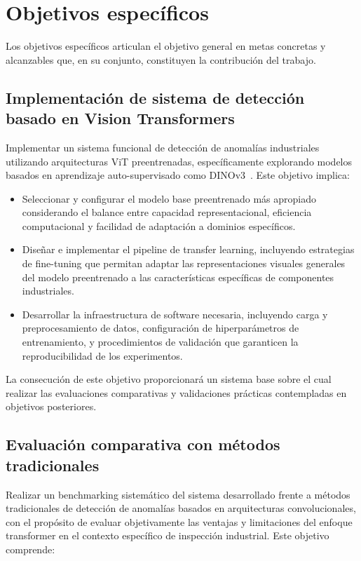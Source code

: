 \section{Objetivos específicos}

Los objetivos específicos articulan el objetivo general en metas concretas y alcanzables que, en su conjunto, constituyen la contribución del trabajo.

\subsection{Implementación de sistema de detección basado en Vision Transformers}

Implementar un sistema funcional de detección de anomalías industriales utilizando arquitecturas \acrlong{ViT} preentrenadas, específicamente explorando modelos basados en aprendizaje auto-supervisado como DINOv3~\cite{simeoni2025dinov3}. Este objetivo implica:

\begin{itemize}
    \item Seleccionar y configurar el modelo base preentrenado más apropiado considerando el balance entre capacidad representacional, eficiencia computacional y facilidad de adaptación a dominios específicos.
    
    \item Diseñar e implementar el pipeline de transfer learning, incluyendo estrategias de fine-tuning que permitan adaptar las representaciones visuales generales del modelo preentrenado a las características específicas de componentes industriales.
    
    \item Desarrollar la infraestructura de software necesaria, incluyendo carga y preprocesamiento de datos, configuración de hiperparámetros de entrenamiento, y procedimientos de validación que garanticen la reproducibilidad de los experimentos.
\end{itemize}

La consecución de este objetivo proporcionará un sistema base sobre el cual realizar las evaluaciones comparativas y validaciones prácticas contempladas en objetivos posteriores.

\subsection{Evaluación comparativa con métodos tradicionales}

Realizar un benchmarking sistemático del sistema desarrollado frente a métodos tradicionales de detección de anomalías basados en arquitecturas convolucionales, con el propósito de evaluar objetivamente las ventajas y limitaciones del enfoque transformer en el contexto específico de inspección industrial. Este objetivo comprende:

